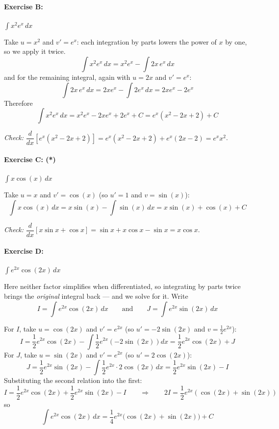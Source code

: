 \documentclass[]{article}
\begin{document}
	\paragraph{Exercise B:} $\displaystyle \int x^2 e^x\,dx$

	Take $u = x^2$ and $v' = e^x$: each integration by parts lowers the power of $x$ by one, so we apply it twice.
	$$
	\int x^2 e^x\,dx = x^2 e^x - \int 2x\, e^x\,dx
	$$
	and for the remaining integral, again with $u = 2x$ and $v' = e^x$:
	$$
	\int 2x\, e^x\,dx = 2x e^x - \int 2 e^x\,dx = 2x e^x - 2e^x
	$$
	Therefore
	$$
	\int x^2 e^x\,dx = x^2 e^x - 2x e^x + 2 e^x + C = e^x\left( x^2 - 2x + 2 \right) + C
	$$

	\textit{Check:} $\dfrac{d}{dx}\left[e^x(x^2-2x+2)\right] = e^x(x^2-2x+2) + e^x(2x-2) = e^x x^2$. \checkmark

	\paragraph{Exercise C: (*)} $\displaystyle \int x \cos(x)\,dx$

	Take $u = x$ and $v' = \cos(x)$ (so $u' = 1$ and $v = \sin(x)$):
	$$
	\int x \cos(x)\,dx = x \sin(x) - \int \sin(x)\,dx = x\sin(x) + \cos(x) + C
	$$

	\textit{Check:} $\dfrac{d}{dx}\left[x\sin x + \cos x\right] = \sin x + x\cos x - \sin x = x \cos x$. \checkmark

	\paragraph{Exercise D:} $\displaystyle \int e^{2x} \cos(2x)\,dx$

	Here neither factor simplifies when differentiated, so integrating by parts twice brings the \textit{original} integral back --- and we solve for it.
	Write
	$$
	I = \int e^{2x}\cos(2x)\,dx
	\qquad \text{and} \qquad
	J = \int e^{2x}\sin(2x)\,dx
	$$

	For $I$, take $u = \cos(2x)$ and $v' = e^{2x}$ (so $u' = -2\sin(2x)$ and $v = \frac{1}{2}e^{2x}$):
	$$
	I = \frac{1}{2}e^{2x}\cos(2x) - \int \frac{1}{2}e^{2x}\left(-2\sin(2x)\right)dx
	  = \frac{1}{2}e^{2x}\cos(2x) + J
	$$
	For $J$, take $u = \sin(2x)$ and $v' = e^{2x}$ (so $u' = 2\cos(2x)$):
	$$
	J = \frac{1}{2}e^{2x}\sin(2x) - \int \frac{1}{2}e^{2x} \cdot 2\cos(2x)\,dx
	  = \frac{1}{2}e^{2x}\sin(2x) - I
	$$
	Substituting the second relation into the first:
	$$
	I = \frac{1}{2}e^{2x}\cos(2x) + \frac{1}{2}e^{2x}\sin(2x) - I
	\qquad \Longrightarrow \qquad
	2I = \frac{1}{2}e^{2x}\left(\cos(2x) + \sin(2x)\right)
	$$
	so
	$$
	\int e^{2x}\cos(2x)\,dx = \frac{1}{4}e^{2x}\Big( \cos(2x) + \sin(2x) \Big) + C
	$$
\end{document}
